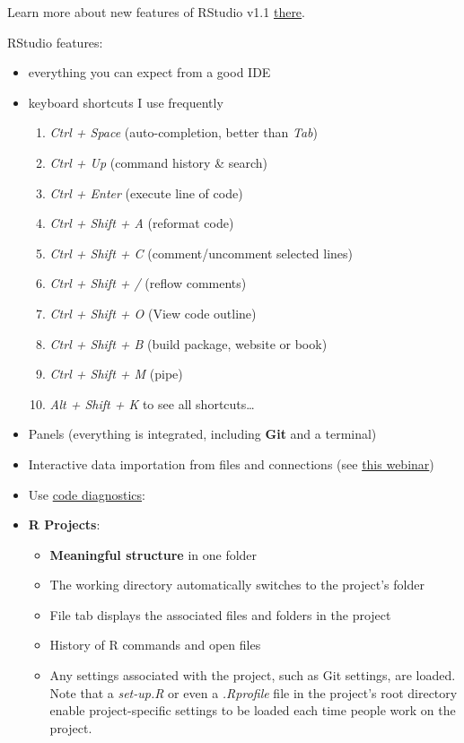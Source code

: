 \documentclass[]{book}
\providecommand{\tightlist}{%
  \setlength{\itemsep}{0pt}\setlength{\parskip}{0pt}}
\theoremstyle{definition}
\theoremstyle{definition}
\theoremstyle{definition}
\theoremstyle{remark}
\begin{document}
Learn more about new features of RStudio v1.1
\href{https://www.rstudio.com/resources/videos/rstudio-1-1-new-features/}{there}.

RStudio features:

\begin{itemize}
\item
  everything you can expect from a good IDE
\item
  keyboard shortcuts I use frequently

  \begin{enumerate}
  \def\labelenumi{\arabic{enumi}.}
  \tightlist
  \item
    \emph{Ctrl + Space} (auto-completion, better than \emph{Tab})
  \item
    \emph{Ctrl + Up} (command history \& search)
  \item
    \emph{Ctrl + Enter} (execute line of code)
  \item
    \emph{Ctrl + Shift + A} (reformat code)
  \item
    \emph{Ctrl + Shift + C} (comment/uncomment selected lines)
  \item
    \emph{Ctrl + Shift + /} (reflow comments)
  \item
    \emph{Ctrl + Shift + O} (View code outline)
  \item
    \emph{Ctrl + Shift + B} (build package, website or book)
  \item
    \emph{Ctrl + Shift + M} (pipe)
  \item
    \emph{Alt + Shift + K} to see all shortcuts\ldots{}
  \end{enumerate}
\item
  Panels (everything is integrated, including \textbf{Git} and a
  terminal)
\item
  Interactive data importation from files and connections (see
  \href{https://www.rstudio.com/resources/webinars/importing-data-into-r/}{this
  webinar})
\item
  Use
  \href{https://support.rstudio.com/hc/en-us/articles/205753617-Code-Diagnostics}{code
  diagnostics}:
\item
  \textbf{R Projects}:

  \begin{itemize}
  \tightlist
  \item
    \textbf{Meaningful structure} in one folder
  \item
    The working directory automatically switches to the project's folder
  \item
    File tab displays the associated files and folders in the project
  \item
    History of R commands and open files
  \item
    Any settings associated with the project, such as Git settings, are
    loaded. Note that a \emph{set-up.R} or even a \emph{.Rprofile} file
    in the project's root directory enable project-specific settings to
    be loaded each time people work on the project.
  \end{itemize}
\end{itemize}
\end{document}
